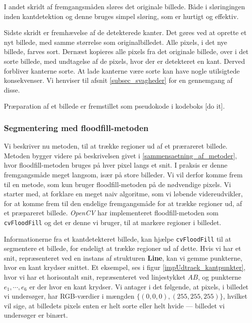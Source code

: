 {I andet skridt af fremgangsmåden sløres det originale billede. Både i
sløringingen inden kantdetektion og denne bruges simpel sløring, som er
hurtigt og effektiv.

Sidste skridt er fremhævelse af de detekterede kanter. Det gøres ved at
oprette et nyt billede, med samme størrelse som originalbilledet. Alle
pixels, i det nye billede, farves sort. Dernæst kopieres alle pixels fra
det originale billede, over i det sorte billede, med undtagelse af de
pixels, hvor der er detekteret en kant. Derved forbliver kanterne sorte.
At lade kanterne være sorte kan have nogle utilsigtede konsekvenser. Vi
henviser til afsnit \ref{subsec_svagheder} for en gennemgang af disse.

Præparation af et billede er fremstillet som pseudokode i kodeboks
[do it].

\subsubsection{Segmentering med floodfill-metoden}
Vi beskriver nu metoden, til at trække regioner ud af et prærareret
billede. Metoden bygger videre på beskrivelsen givet i
\ref{sammensaetning_af_metoder}, hvor floodfill-metoden bruges på hver
pixel langs et snit. I praksis er denne fremgangsmåde meget langsom,
især på store billeder. Vi vil derfor komme frem til en metode, som kun
bruger floodfill-metoden på de nødvendige pixels.  Vi starter med, at
forklare en meget naiv algoritme, som vi løbende videreudvikler, for at
komme frem til den endelige fremgangsmåde for at trække regioner ud, af
et præpareret billede. \emph{OpenCV} har implementeret floodfill-metoden
som \texttt{cvFloodFill} og det er denne vi bruger, til at markere
regioner i billedet.

Informationerne fra et kantdetekteret billede, kan hjælpe
\texttt{cvFloodFill} til at segmentere et billede, for endeligt at
trække regioner ud af dette. Hvis vi har et snit, repræsenteret ved en
instans af strukturen \textbf{Line}, kan vi gemme punkterne, hvor en
kant krydser snittet. Et eksempel, ses i figur
\ref{impUdtraek_kantpunkter}, hvor vi har et horisontalt snit,
repræsenteret ved linjestykket $AB$, og punkterne $e_1, \cdots, e_6$ er
der hvor en kant krydser. Vi antager i det følgende, at pixels, i
billedet vi undersøger, har RGB-værdier i mængden
$\{(0,0,0),(255,255,255)\}$, hvilket vil sige, at billedets pixels enten
er helt sorte eller helt hvide --- billedet vi undersøger er binært.

}
